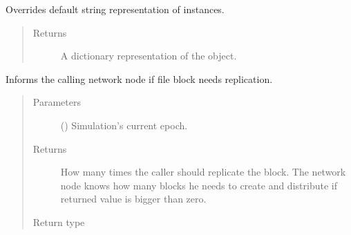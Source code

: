 \documentclass[letterpaper,10pt,english]{sphinxmanual}
\begin{document}
\begin{fulllineitems}
\begin{fulllineitems}
\end{fulllineitems}


\begin{fulllineitems}
\label{\detokenize{app.domain.helpers:app.domain.helpers.smart_dataclasses.FileBlockData.__str__}}
Overrides default string representation of  instances.
\begin{quote}\begin{description}
\item[{Returns}] \leavevmode
A dictionary representation of the object.

\end{description}\end{quote}

\end{fulllineitems}


\begin{fulllineitems}
\label{\detokenize{app.domain.helpers:app.domain.helpers.smart_dataclasses.FileBlockData.can_replicate}}
Informs the calling network node if file block needs replication.
\begin{quote}\begin{description}
\item[{Parameters}] \leavevmode
{} () \textendash{} Simulation’s current epoch.

\item[{Returns}] \leavevmode
How many times the caller should replicate the block. The network
node knows how many blocks he needs to create and distribute if
returned value is bigger than zero.

\item[{Return type}] \leavevmode
{}

\end{description}\end{quote}


\end{fulllineitems}
\end{fulllineitems}
\end{document}

